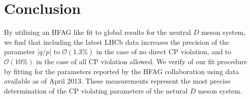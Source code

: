 \section{Conclusion}
\label{sec:Conclusion}
By utilizing an HFAG like fit to global results for the neutral $D$ meson system,
we find that including the latest LHCb data increases the precision of the parameter 
$|q/p|$ to $\mathcal{O}(1.3\%)$ in the case of no direct CP violation, and to $\mathcal{O}(10\%)$
 in the case of all CP violation allowed. We verify of our fit procedure by fitting for 
the parameters reported by the HFAG collaboration using data available as of April 2013. 
These measurements represent the most precise determination of the CP violating
parameters of the netural $D$ meson system.
